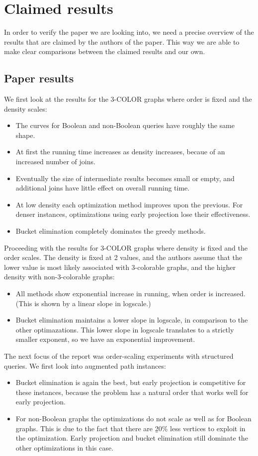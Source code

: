 \section{Claimed results}
In order to verify the paper we are looking into, we need a precise overview of the results that are claimed by the authors of the paper. This way we are able to make clear comparisons between the claimed results and our own.\\

\subsection{Paper results}
We first look at the results for the 3-COLOR graphs where order is fixed and the density scales:
\begin{itemize}
	\item The curves for Boolean and non-Boolean queries have roughly the same shape.
	\item At first the running time increases as density increases, becaue of an increased number of joins.
	\item Eventually the size of intermediate results becomes small or empty, and additional joins have little effect on overall running time.
	\item At low density each optimization method improves upon the previous. For denser instances, optimizations using early projection lose their effectiveness.
	\item Bucket elimination completely dominates the greedy methods.
\end{itemize}

\noindent Proceeding with the results for 3-COLOR graphs where density is fixed and the order scales. The density is fixed at 2 values, and the authors assume that the lower value is most likely associated with 3-colorable graphs, and the higher density with non-3-colorable graphs:
\begin{itemize}
	\item All methods show exponential increase in running, when order is increased. (This is shown by a linear slope in logscale.)
	\item Bucket elimination maintains a lower slope in logscale, in comparison to the other optimazations. This lower slope in logscale translates to a strictly smaller exponent, so we have an exponential improvement.
\end{itemize}

\noindent The next focus of the report was order-scaling experiments with structured queries. We first look into augmented path instances:
\begin{itemize}
	\item Bucket elimination is again the best, but early projection is competitive for these instances, because the problem has a natural order that works well for early projection.
	\item For non-Boolean graphs the optimizations do not scale as well as for Boolean graphs. This is due to the fact that there are {\b 20\% less vertices to exploit in the optimization}. Early projection and bucket elimination still dominate the other optimizations in this case.
\end{itemize}

